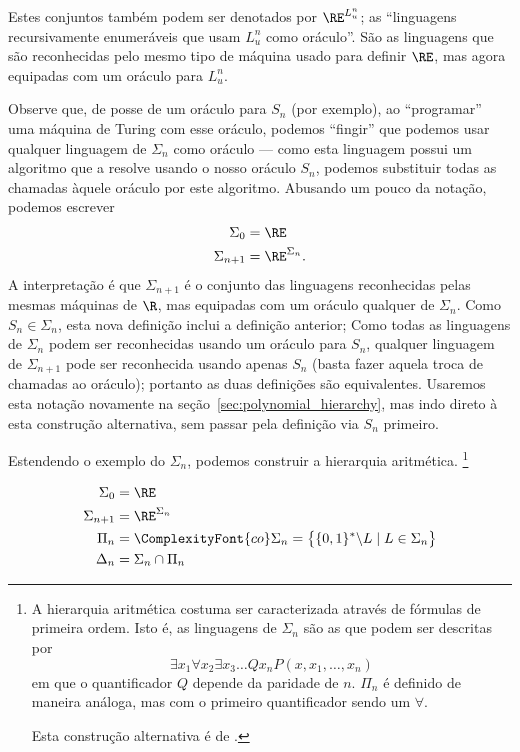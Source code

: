 Estes conjuntos também podem ser denotados por $\RE^{L_u^n}$;
as ``linguagens recursivamente enumeráveis que usam $L_u^n$ como oráculo''.
São as linguagens que são reconhecidas
pelo mesmo tipo de máquina usado para definir $\RE$,
mas agora equipadas com um oráculo para $L_u^n$.

Observe que,
de posse de um oráculo para $S_n$ (por exemplo),
ao ``programar'' uma máquina de Turing com esse oráculo,
podemos ``fingir'' que podemos usar qualquer linguagem de $\Sigma_n$ como oráculo
--- como esta linguagem possui um algoritmo que a resolve
usando o nosso oráculo $S_n$,
podemos substituir todas as chamadas àquele oráculo
por este algoritmo.
Abusando um pouco da notação,
podemos escrever
\begin{equation}
    \begin{aligned}
        \Sigma_0 &= \RE \\
        \Sigma_{n+1} &= \RE^{\Sigma_n}.
    \end{aligned}
    \label{eq:oracle_notation_abuse}
\end{equation}
A interpretação é que $\Sigma_{n+1}$ é o conjunto das linguagens
reconhecidas pelas mesmas máquinas de $\R$,
mas equipadas com um oráculo qualquer de $\Sigma_n$.
Como $S_n \in \Sigma_n$, esta nova definição inclui a definição anterior;
Como todas as linguagens de $\Sigma_n$
podem ser reconhecidas usando um oráculo para $S_n$,
qualquer linguagem de $\Sigma_{n+1}$
pode ser reconhecida usando apenas $S_n$
(basta fazer aquela troca de chamadas ao oráculo);
portanto as duas definições são equivalentes.
Usaremos esta notação novamente na seção~\ref{sec:polynomial_hierarchy},
mas indo direto à esta construção alternativa,
sem passar pela definição via $S_n$ primeiro.

Estendendo o exemplo do $\Sigma_n$,
podemos construir a hierarquia aritmética.%
\footnote{
    A hierarquia aritmética costuma ser caracterizada
    através de fórmulas de primeira ordem.
    Isto é,
    as linguagens de $\Sigma_n$ são as que podem ser descritas por
    \begin{equation*}
        \exists x_1 \forall x_2 \exists x_3 \dots Q x_n P(x, x_1, \dots, x_n)
    \end{equation*}
    em que o quantificador $Q$ depende da paridade de $n$.
    $\Pi_n$ é definido de maneira análoga,
    mas com o primeiro quantificador sendo um $\forall$.

    Esta construção alternativa é de .
}
\begin{definition}
    \begin{align*}
        \Sigma_0 &= \RE \\
        \Sigma_{n+1} &= \RE^{\Sigma_n} \\
        \Pi_n &= \ComplexityFont{co}\Sigma_n =
            \big\{ \{0, 1\}^* \backslash L \mid L \in \Sigma_n \big\} \\
        \Delta_n &= \Sigma_n \cap \Pi_n \\
    \end{align*}
\end{definition}

